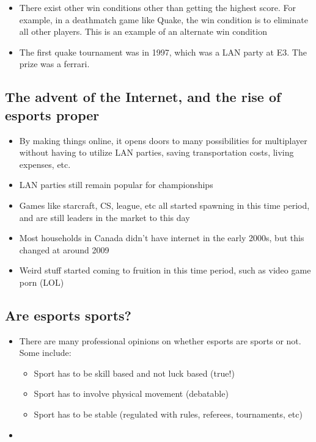 \documentclass[12pt]{book}
\begin{document}
\begin{itemize}
    \item There exist other win conditions other than getting the highest score. For example, in a deathmatch game like Quake, the win condition is to eliminate all other players. This is an example of an alternate win condition
    \item The first quake tournament was in 1997, which was a LAN party at E3. The prize was a ferrari.
\end{itemize}

\subsection{The advent of the Internet, and the rise of esports proper}

\begin{itemize}
    \item By making things online, it opens doors to many possibilities for multiplayer without having to utilize LAN parties, saving transportation costs, living expenses, etc.
    \item LAN parties still remain popular for championships
    \item Games like starcraft, CS, league, etc all started spawning in this time period, and are still leaders in the market to this day
    \item Most households in Canada didn't have internet in the early 2000s, but this changed at around 2009
    \item Weird stuff started coming to fruition in this time period, such as video game porn (LOL)
\end{itemize}

\subsection{Are esports sports?}

\begin{itemize}
    \item There are many professional opinions on whether esports are sports or not. Some include:
    \begin{itemize}
        \item Sport has to be skill based and not luck based (true!)
        \item Sport has to involve physical movement (debatable)
        \item Sport has to be stable (regulated with rules, referees, tournaments, etc)
    \end{itemize}

    \item 
\end{itemize}
\end{document}
